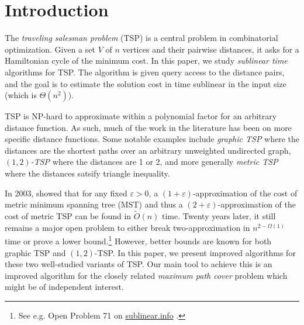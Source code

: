 \documentclass[letterpaper,11pt]{article}
\renewcommand{\epsilon}{\varepsilon}
\begin{document}
\clearpage

\setcounter{tocdepth}{2}
\tableofcontents
\thispagestyle{empty}

\clearpage

\setcounter{page}{1}

\section{Introduction}

The {\em traveling salesman problem} (TSP) is a central problem in combinatorial optimization. Given a set $V$ of $n$ vertices and their pairwise distances, it asks for a Hamiltonian cycle of the minimum cost. In this paper, we study {\em sublinear time} algorithms for TSP. The algorithm is given query access to the distance pairs, and the goal is to estimate the solution cost in time sublinear in the input size (which is $\Theta(n^2)$).

TSP is NP-hard to approximate within a polynomial factor for an arbitrary distance function. As such, much of the work in the literature has been on more specific distance functions. Some notable examples include {\em graphic TSP} \cite{GharanSS11,MomkeS11,Mucha12,SeboV14,chen2020} where the distances are the shortest paths over an arbitrary unweighted undirected graph, {\em $(1, 2)$-TSP} \cite{AdamaszekMP18,chen2020,BermanK06,karp1972reducibility,MnichM18} where the distances are 1 or 2, and more generally {\em metric TSP} \cite{KarlinKG21,CzumajS-SIAM09,christofides1976worst,serdyukov1978nekotorykh} where the distances satsify triangle inequality. 

In 2003, \citet*{CzumajS-STOC04,CzumajS-SIAM09} showed that for any fixed $\epsilon > 0$, a $(1+\epsilon)$-approximation of the cost of metric minimum spanning tree (MST) and thus a  $(2+\epsilon)$-approximation of the cost of metric TSP can be found in $\widetilde{O}(n)$ time. Twenty years later, it still remains a major open problem to either break two-approximation in $n^{2-\Omega(1)}$ time or prove a lower bound.\footnote{See e.g. Open Problem 71 on \href{https://sublinear.info/index.php?title=Open_Problems:71}{sublinear.info} \cite{sublinear-info}.}
However, better bounds are known for both graphic TSP and $(1,2)$-TSP. In this paper, we present improved algorithms for these two well-studied variants of TSP. Our main tool to achieve this is an improved algorithm for the closely related {\em maximum path cover} problem which might be of independent interest.
\end{document}
